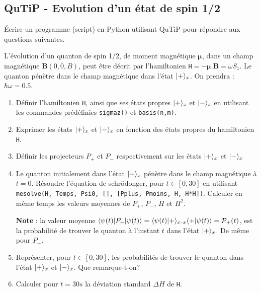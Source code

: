 \subsection{QuTiP - Evolution d'un état de spin 1/2}

Écrire un programme (script) en Python utilisant QuTiP pour répondre aux
questions suivantes.

L'évolution d'un quanton de spin 1/2, de moment magnétique $\mathbf{\mu}$, dans un champ magnétique $\textbf{B}(0,0,B)$, peut être décrit par l'hamiltonien \texttt{H}$=-\mathbf{\mu}.\textbf{B}=\omega S_z$. Le quanton pénètre dans le champ magnétique dans l'état $\vert+\rangle_x$. On prendra : $\hbar\omega=0.5$.
\begin{enumerate}
\item Définir l'hamiltonien \texttt{H}, ainsi que ses états propres $\vert+\rangle_z$ et $\vert-\rangle_z$ en utilisant les commandes prédéfinies \texttt{sigmaz()} et \texttt{basis(n,m)}.

\item Exprimer les états $\vert+\rangle_x$ et $\vert-\rangle_x$ en fonction des états propres du hamiltonien \texttt{H}.

\item Définir les projecteurs $P_+$ et $P_-$ respectivement sur les états $\vert+\rangle_x$ et $\vert-\rangle_x$

\item Le quanton initialement dans l'état $\vert+\rangle_x$ pénètre dans le champ magnétique à $t=0$. Résoudre l'équation de schr\"odonger, pour $t\in[0,30]$ en utilisant \texttt{mesolve(H, Temps, Psi0, [], [Pplus, Pmoins, H, H*H])}. Calculer en même temps les valeurs moyennes de $P_+$, $P_-$, $H$ et $H^2$.

\textbf{Note} : la valeur moyenne $\langle\psi(t)\vert P_+\vert\psi(t)\rangle=\langle\psi(t)\vert+\rangle_x ._x\langle+\vert\psi(t)\rangle=\mathcal{P}_+(t)$, est la probabilité de trouver le quanton à l'instant $t$ dans l'état $\vert+\rangle_x$. De même pour $P_-$.

\item Représenter, pour $t\in[0,30]$, les probabilités de trouver le quanton dans l'état $\vert+\rangle_x$ et $\vert-\rangle_x$. Que remarque-t-on?

\item Calculer pour $t=30s$ la déviation standard $\Delta H$ de \texttt{H}.
\end{enumerate}